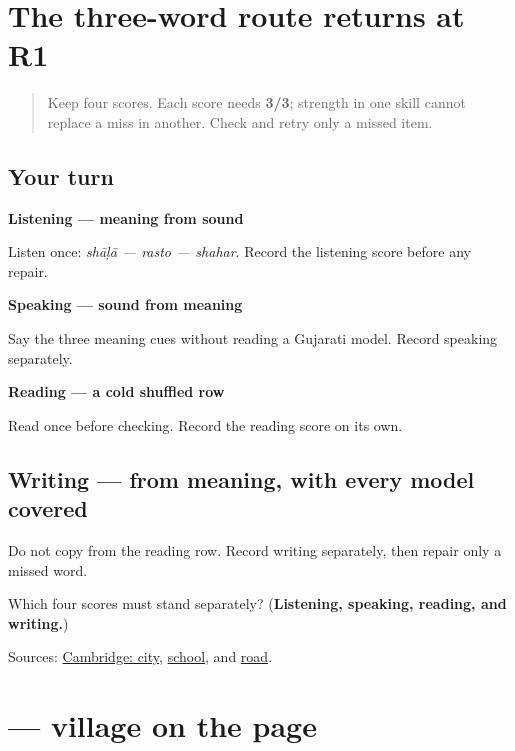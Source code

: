 \section[\texorpdfstring{\gu{શહેર} — \gu{શાળા} — \gu{રસ્તો} (shahar — shāḷā …)}{શહેર — શાળા — રસ્તો (shahar — shāḷā …)}]{The three-word route returns at R1}

\label{lesson:GU-R23-route-three-r1}



\begin{quote}
Keep four scores. Each score needs \textbf{3/3}; strength in one skill cannot replace a miss in another. Check and retry only a missed item.
\end{quote}

\subsection*{Your turn}
\textbf{Listening — meaning from sound}

Listen once: \emph{shāḷā — rasto — shahar}. Record the listening score before any repair.

\textbf{Speaking — sound from meaning}

Say the three meaning cues without reading a Gujarati model. Record speaking separately.

\textbf{Reading — a cold shuffled row}

Read once before checking. Record the reading score on its own.

\subsection*{Writing — from meaning, with every model covered}
Do not copy from the reading row. Record writing separately, then repair only a missed word.

\begin{tcolorbox}[breakable,colback=teal!4,colframe=teal!35!black,title={Before you move on}]
Which four scores must stand separately? (\textbf{Listening, speaking, reading, and writing.})

Sources: \href{https://dictionary.cambridge.org/dictionary/english-gujarati/city}{Cambridge: city}, \href{https://dictionary.cambridge.org/dictionary/english-gujarati/school}{school}, and \href{https://dictionary.cambridge.org/dictionary/english-gujarati/road}{road}.
\end{tcolorbox}
\section[\texorpdfstring{\gu{ગામ} (gām)}{ગામ (gām)}]{ — village on the page}

